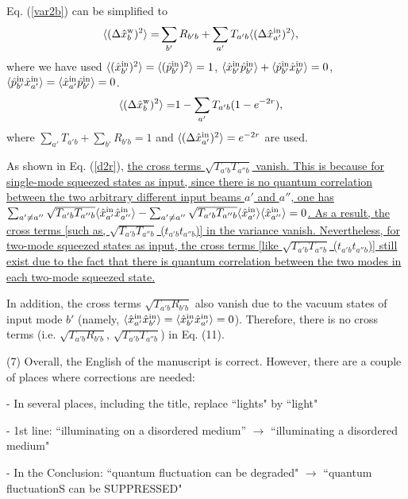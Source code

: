 \documentclass[10pt]{article}
\begin{document}
Eq. (\ref{var2b}) can be simplified to
\begin{align}
\langle (\Delta \hat{x}^{\rm{w}}_b)^2 \rangle=& \sum_{b'} R_{b'b} + \sum_{a'} T_{a'b} \langle (\Delta \hat{x}^{\rm{in}}_{a'})^2 \rangle,
\end{align}
where we have used $\langle (\hat{x}_{b'}^{\rm{in}})^2\rangle = \langle (\hat{p}_{b'}^{\rm{in}})^2\rangle = 1$, $\langle \hat{x}_{b'}^{\rm{in}} \hat{p}_{b'}^{\rm{in}}\rangle + \langle \hat{p}_{b'}^{\rm{in}} \hat{x}_{b'}^{\rm{in}}\rangle = 0$, $\langle \hat{p}_{b'}^{\rm{in}} \hat{x}_{a'}^{\rm{in}}\rangle =\langle \hat{x}_{a'}^{\rm{in}} \hat{p}_{b'}^{\rm{in}} \rangle= 0$.
\begin{align}
\label{d2r}
\langle (\Delta \hat{x}^{\rm{w}}_b)^2 \rangle=& 1- \sum_{a'} T_{a'b} (1 - e^{-2r}),
\end{align}
where $\sum_{a'} T_{a'b} + \sum_{b'} R_{b'b} = 1$ and $\langle (\Delta \hat{x}^{\rm{in}}_{a'})^2 \rangle = e^{-2r}$ are used.

As shown in Eq. (\ref{d2r}), {\uline{the cross terms $\sqrt{T_{a'b} T_{a''b}}$ vanish. This is because for single-mode squeezed states as input, since there is no quantum correlation between the two arbitrary different input beams $a'$ and $a''$, one has $\sum_{a'\neq a''}  \sqrt{T_{a'b} T_{a''b}}   \langle\hat{x}_{a'}^{\rm{in}} \hat{x}_{a''}^{\rm{in}}\rangle - \sum_{a'\neq a''}  \sqrt{T_{a'b} T_{a''b}}   \langle\hat{x}_{a'}^{\rm{in}} \rangle \langle \hat{x}_{a''}^{\rm{in}}\rangle = 0$. As a result, the cross terms [such as, $\sqrt{T_{a'b} T_{a''b}}$ ($t_{a'b} t_{a''b}$)] in the variance vanish. Nevertheless, for two-mode squeezed states as input, the cross terms [like $\sqrt{T_{a'b} T_{a''b}}$ ($t_{a'b} t_{a''b}$)] still exist due to the fact that there is quantum correlation between the two modes in each two-mode squeezed state.}}

In addition, the cross terms $\sqrt{T_{a'b} R_{b'b}}$ also vanish due to the vacuum states of input mode $b'$ (namely, $\langle \hat{x}_{a'}^{\rm{in}} \hat{x}_{b'}^{\rm{in}} \rangle =\langle \hat{x}_{b'}^{\rm{in}} \hat{x}_{a'}^{\rm{in}} \rangle=0$). Therefore, there is no cross terms (i.e. $\sqrt{T_{a'b} R_{b'b}}$, $\sqrt{T_{a'b} T_{a''b}}$) in Eq. (11).

\newpage

{\bf{(7) Overall, the English of the manuscript is correct. However, there are a couple of places where corrections are needed:

- In several places, including the title, replace ``lights" by ``light"

- 1st line: ``illuminating on a disordered medium” $\to$ ``illuminating a disordered medium"

- In the Conclusion: ``quantum fluctuation can be degraded" $\to$ ``quantum fluctuationS can be SUPPRESSED"}}
\end{document}

